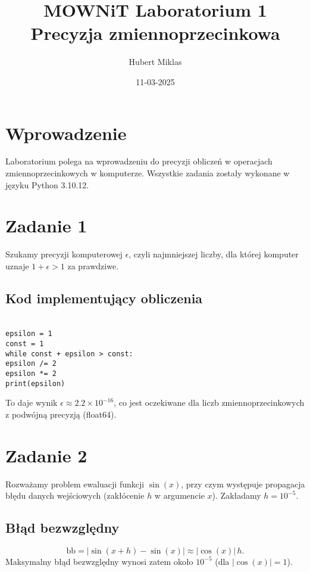 \documentclass{article}
\title{MOWNiT Laboratorium 1\\Precyzja zmiennoprzecinkowa}
\author{Hubert Miklas}
\date{11-03-2025}
\begin{document}
\maketitle

\section{Wprowadzenie}

Laboratorium polega na wprowadzeniu do precyzji obliczeń w operacjach zmiennoprzecinkowych w komputerze. Wszystkie zadania zostały wykonane w języku Python 3.10.12.

\section{Zadanie 1}

Szukamy precyzji komputerowej $\epsilon$, czyli najmniejszej liczby, dla której komputer uznaje $1 + \epsilon > 1$ za prawdziwe. 

\subsection{Kod implementujący obliczenia}

\texttt{\\
epsilon = 1\\
const = 1\\
while const + epsilon > const:\\
\quad epsilon /= 2\\
epsilon *= 2\\
print(epsilon)\\
}

To daje wynik $\epsilon \approx 2.2\times10^{-16}$, co jest oczekiwane dla liczb zmiennoprzecinkowych z podwójną precyzją (float64).


\section{Zadanie 2}

Rozważamy problem ewaluacji funkcji $\sin(x)$, przy czym występuje propagacja błędu danych wejściowych (zakłócenie $h$ w argumencie $x$). Zakładamy $h = 10^{-5}$.

\subsection{Błąd bezwzględny} 
\[
\text{bb} = \left|\sin(x+h) - \sin(x)\right| \approx |\cos(x)|\, h.
\]
Maksymalny błąd bezwzględny wynosi zatem około $10^{-5}$ (dla $|\cos(x)|=1$).
\end{document}
